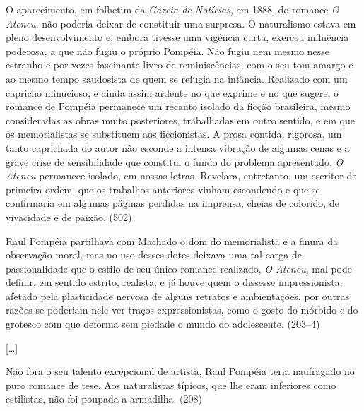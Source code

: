 

O aparecimento, em folhetim da \textit{Gazeta
de Notícias}, em 1888, do romance \textit{O
Ateneu}, não poderia deixar de constituir uma
surpresa. O naturalismo estava em pleno desenvolvimento e, embora
tivesse uma vigência curta, exerceu influência poderosa, a que não
fugiu o próprio Pompéia. Não fugiu nem mesmo nesse estranho e por vezes
fascinante livro de reminiscências, com o seu tom amargo e ao mesmo
tempo saudosista de quem se refugia na infância. Realizado com um
capricho minucioso, e ainda assim ardente no que exprime e no que
sugere, o romance de Pompéia permanece um recanto isolado da ficção
brasileira, mesmo consideradas as obras muito posteriores, trabalhadas
em outro sentido, e em que os memorialistas se substituem aos
ficcionistas. A prosa contida, rigorosa, um tanto caprichada do autor
não esconde a intensa vibração de algumas cenas e a grave crise de
sensibilidade que constitui o fundo do problema apresentado.
\textit{O Ateneu} permanece isolado, em
nossas letras. Revelara, entretanto, um escritor de primeira ordem, que
os trabalhos anteriores vinham escondendo e que se confirmaria em
algumas páginas perdidas na imprensa, cheias de colorido, de vivacidade
e de paixão. (502)



Raul Pompéia partilhava com Machado o dom do
memorialista e a finura da observação moral, mas no uso desses dotes
deixava uma tal carga de passionalidade que o estilo de seu único
romance realizado, \textit{O Ateneu}, mal
pode definir, em sentido estrito, realista; e já houve quem o dissesse
impressionista, afetado pela plasticidade nervosa de alguns retratos e
ambientações, por outras razões se poderiam nele ver traços
expressionistas, como o gosto do mórbido e do grotesco com que deforma
sem piedade o mundo do adolescente. (203--4)

[\ldots]

Não fora o seu talento excepcional de artista, Raul Pompéia teria
naufragado no puro romance de tese. Aos naturalistas típicos, que lhe
eram inferiores como estilistas, não foi poupada a armadilha. (208) 

